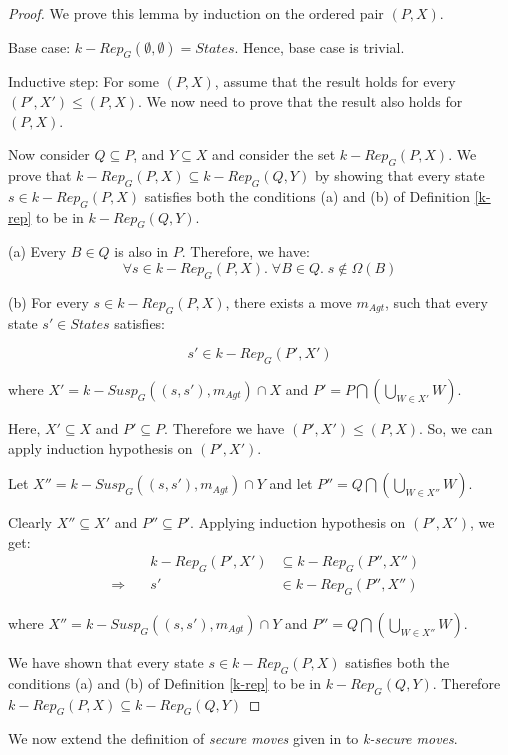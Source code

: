 \begin{proof}
We prove this lemma by induction on the ordered pair $(P, X)$.

Base case: $k-Rep_{G}(\emptyset, \emptyset) = States$. Hence, base case is trivial.

Inductive step: For some $(P, X)$, assume that the result holds for every $(P', X') \leq (P, X)$. We now need to prove that the result also holds for $(P, X)$.

Now consider $Q \subseteq P$, and $Y \subseteq X$ and consider the set $k-Rep_{G}(P, X)$. We prove that $k-Rep_{G}(P, X) \subseteq k-Rep_{G}(Q, Y)$ by showing that every state $s \in k-Rep_{G}(P, X)$ satisfies both the conditions (a) and (b) of Definition \ref{k-rep} to be in $k-Rep_{G}(Q, Y)$.

(a) Every $B \in Q$ is also in $P$. Therefore, we have:
\[\forall s \in k-Rep_{G}(P, X). \; \forall B \in Q. \; s \notin \Omega(B)\]

(b) For every $s \in k-Rep_{G}(P, X)$, there exists a move $m_{Agt}$, such that every state $s' \in States$ satisfies:

\[s' \in k-Rep_{G}(P', X')\]

where $X' = k-Susp_{G}((s, s'), m_{Agt}) \cap X$ and $P' = P \bigcap \left( \bigcup \limits_{W \in X'}W \right)$.

Here, $X' \subseteq X$ and $P' \subseteq P$. Therefore we have $(P', X') \leq (P, X)$. So, we can apply induction hypothesis on $(P', X')$.

Let $X'' = k-Susp_{G}((s, s'), m_{Agt}) \cap Y$ and let $P'' = Q \bigcap \left( \bigcup \limits_{W \in X''}W \right)$.

Clearly $X'' \subseteq X'$ and $P'' \subseteq P'$. Applying induction hypothesis on $(P', X')$, we get:
\begin{align*}
&\qquad & k-Rep_{G}(P', X') &\subseteq k-Rep_{G}(P'', X'')\\
&\Rightarrow & s' &\in k-Rep_{G}(P'', X'')
\end{align*}

where $X'' = k-Susp_{G}((s, s'), m_{Agt}) \cap Y$ and $P'' = Q \bigcap \left( \bigcup \limits_{W \in X''}W \right)$.

We have shown that every state $s \in k-Rep_{G}(P, X)$ satisfies both the conditions (a) and (b) of Definition \ref{k-rep} to be in $k-Rep_{G}(Q, Y)$. Therefore $k-Rep_{G}(P, X) \subseteq k-Rep_{G}(Q, Y)$ 
\end{proof}

We now extend the definition of \textit{secure moves} given in \cite{BBM-concur10,BBM-report} to \textit{k-secure moves}.

